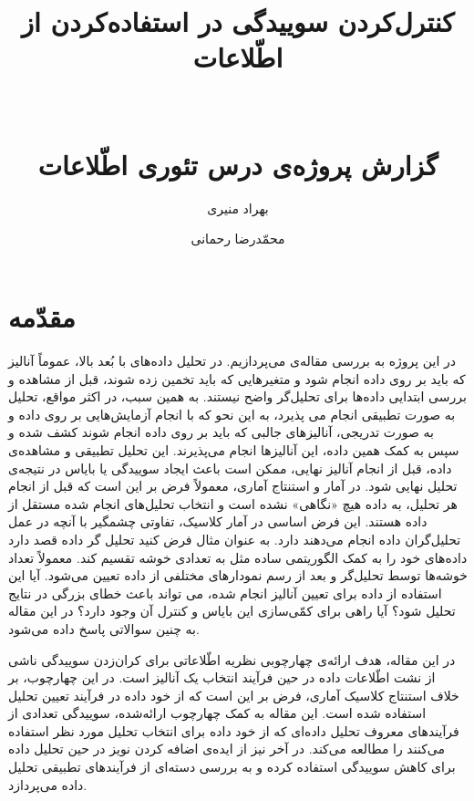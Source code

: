 \documentclass[a4paper,12pt]{article}
\title{
	کنترل‌کردن سوییدگی در استفاده‌کردن از اطّلاعات\\
	\vspace{0.5cm}
	\Large{\lr{How much does your data exploration overfit? \\Controlling bias via information usage}}\\
	\large{\lr{Daniel Russo and James Zou}}\\
	\large{گزارش پروژه‌ی درس تئوری اطّلاعات}
}
\author{
	بهراد منیری
	\and
	محمّدرضا رحمانی
}
\date{}
\begin{document}
	
	\maketitle
	\clearpage
	\tableofcontents
	\clearpage
	
	\section{مقدّمه}
	در این پروژه‌ به بررسی مقاله‌ی 
	\cite{zou}
	می‌پردازیم. در تحلیل داده‌های  با بُعد بالا، عموماً  آنالیز که باید بر روی داده انجام شود و متغیر‌هایی که باید تخمین ‌زده شوند،  قبل از مشاهده‌ و بررسی ابتدایی داده‌ها برای تحلیل‌گر واضح نیستند.  به همین سبب، در اکثر مواقع، تحلیل به صورت تطبیقی انجام می پذیرد، به  این نحو که با انجام آزمایش‌هایی بر روی داده و به صورت تدریجی، آنالیز‌های جالبی که باید بر روی داده‌ انجام شوند کشف شده و سپس به کمک همین داده، این آنالیز‌ها انجام می‌پذیرند. این تحلیل تطبیقی و مشاهده‌ی داده، قبل از انجام آنالیز نهایی، ممکن است باعث ایجاد سوییدگی یا بایاس در نتیجه‌ی تحلیل نهایی شود. در آمار و استنتاج آماری، معمولاً فرض بر این است که قبل از انجام هر تحلیل، به داده‌ هیچ «نگاهی» نشده است و انتخاب تحلیل‌های انجام شده‌ مستقل از داده هستند. این فرض اساسی در آمار کلاسیک، تفاوتی چشمگیر با آنچه در عمل تحلیل‌گران داده انجام می‌دهند دارد. به عنوان مثال فرض کنید تحلیل گر داده قصد دارد داده‌های خود را به کمک الگوریتمی ساده مثل 
	به تعدادی خوشه تقسیم کند. معمولاً تعداد خوشه‌ها توسط تحلیل‌گر و بعد از رسم نمودارهای مختلفی از داده تعیین می‌شود. آیا این استفاده از داده برای تعیین آنالیز انجام شده، می تواند باعث خطای بزرگی در نتایج تحلیل شود؟  آیا راهی برای کمّی‌سازی این بایاس  و کنترل آن وجود دارد؟ در این مقاله به چنین سوالاتی پاسخ داده می‌شود.
	
	در این مقاله، هدف ارائه‌ی چهارچوبی نظریه‌‌ اطّلاعاتی برای کران‌زدن سوییدگی ناشی از نشت اطّلاعات داده در حین فرآیند انتخاب یک آنالیز است. در این چهارچوب، بر خلاف استنتاج کلاسیک آماری، فرض بر این است که از خود داده در فرآیند تعیین تحلیل استفاده شده است. این مقاله به کمک چهارچوب ارائه‌شده، سوییدگی تعدادی از فرآیند‌های معروف تحلیل داده‌ای که از خود داده برای انتخاب تحلیل مورد نظر استفاده می‌کنند را مطالعه می‌کند. در آخر نیز از ایده‌ی اضافه کردن نویز در حین تحلیل داده برای کاهش سوییدگی استفاده کرده و به بررسی دسته‌ای از فرآیند‌های تطبیقی تحلیل داده می‌پردازد. 
	
\end{document}
